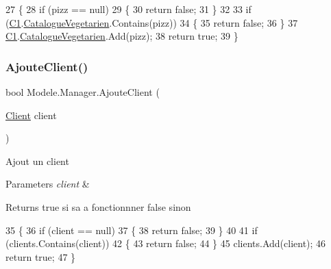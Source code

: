 \begin{DoxyCode}
27         \{
28             \textcolor{keywordflow}{if} (pizz == null)
29             \{
30                 \textcolor{keywordflow}{return} \textcolor{keyword}{false};
31             \}
32 
33             \textcolor{keywordflow}{if} (\hyperlink{classModele_1_1Manager_a54bbc7bd646fcaa0f1a590310dd3c02c}{C1}.\hyperlink{classModele_1_1Catalogue_abd7d6d70ddd6ba264c1c91a5b084d9ba}{CatalogueVegetarien}.Contains(pizz))
34             \{
35                 \textcolor{keywordflow}{return} \textcolor{keyword}{false};
36             \}
37             \hyperlink{classModele_1_1Manager_a54bbc7bd646fcaa0f1a590310dd3c02c}{C1}.\hyperlink{classModele_1_1Catalogue_abd7d6d70ddd6ba264c1c91a5b084d9ba}{CatalogueVegetarien}.Add(pizz);
38             \textcolor{keywordflow}{return} \textcolor{keyword}{true};
39         \}
\end{DoxyCode}
\mbox{\label{classModele_1_1Manager_ac039c39ae05fd7b3ef9fae78d2332330}} 
\subsubsection{\texorpdfstring{Ajoute\+Client()}{AjouteClient()}}
{\footnotesize\ttfamily bool Modele.\+Manager.\+Ajoute\+Client (\begin{DoxyParamCaption}\item[{\hyperlink{classModele_1_1Client}{Client}}]{client }\end{DoxyParamCaption})\hspace{0.3cm}{\ttfamily [inline]}}



Ajout un client 


\begin{DoxyParams}{Parameters}
{\em client} & \\
\hline
\end{DoxyParams}
\begin{DoxyReturn}{Returns}
true si sa a fonctionnner false sinon
\end{DoxyReturn}

\begin{DoxyCode}
35         \{
36             \textcolor{keywordflow}{if} (client == null)
37             \{
38                 \textcolor{keywordflow}{return} \textcolor{keyword}{false};
39             \}
40 
41             \textcolor{keywordflow}{if} (clients.Contains(client))
42             \{
43                 \textcolor{keywordflow}{return} \textcolor{keyword}{false};
44             \}
45             clients.Add(client);
46             \textcolor{keywordflow}{return} \textcolor{keyword}{true};
47         \}
\end{DoxyCode}
\mbox{\label{classModele_1_1Manager_a4353e79d770294bd16ecdbbbdde48e2e}} 
